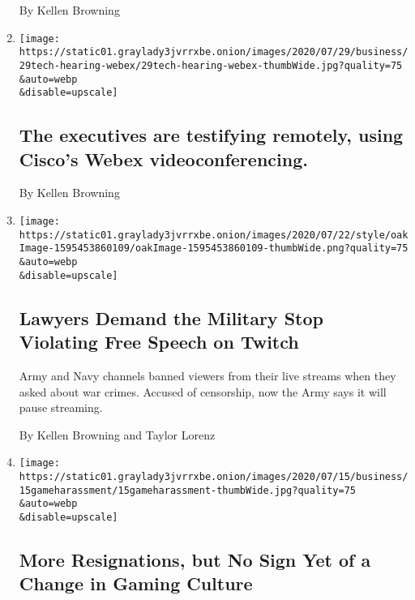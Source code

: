 \begin{enumerate}
  By Kellen Browning
\item
  \href{/live/2020/07/29/technology/tech-ceos-hearing-testimony/the-executives-are-testifying-remotely-using-ciscos-webex-videoconferencing}{}

  \texttt{[image: https://static01.graylady3jvrrxbe.onion/images/2020/07/29/business/29tech-hearing-webex/29tech-hearing-webex-thumbWide.jpg?quality=75\\\&auto=webp\\\&disable=upscale]}

  \hypertarget{the-executives-are-testifying-remotely-using-ciscos-webex-videoconferencing}{%
  \subsection{The executives are testifying remotely, using Cisco's
  Webex
  videoconferencing.}\label{the-executives-are-testifying-remotely-using-ciscos-webex-videoconferencing}}

  By Kellen Browning
\item
  \href{/2020/07/22/style/army-gamers-war-crimes-first-amendment.html}{}

  \texttt{[image: https://static01.graylady3jvrrxbe.onion/images/2020/07/22/style/oakImage-1595453860109/oakImage-1595453860109-thumbWide.png?quality=75\\\&auto=webp\\\&disable=upscale]}

  \hypertarget{lawyers-demand-the-military-stop-violating-free-speech-on-twitch}{%
  \subsection{Lawyers Demand the Military Stop Violating Free Speech on
  Twitch}\label{lawyers-demand-the-military-stop-violating-free-speech-on-twitch}}

  Army and Navy channels banned viewers from their live streams when
  they asked about war crimes. Accused of censorship, now the Army says
  it will pause streaming.

  By Kellen Browning and Taylor Lorenz
\item
  \href{/2020/07/19/technology/gaming-harassment.html}{}

  \texttt{[image: https://static01.graylady3jvrrxbe.onion/images/2020/07/15/business/15gameharassment/15gameharassment-thumbWide.jpg?quality=75\\\&auto=webp\\\&disable=upscale]}

  \hypertarget{more-resignations-but-no-sign-yet-of-a-change-in-gaming-culture}{%
  \subsection{More Resignations, but No Sign Yet of a Change in Gaming
  Culture}\label{more-resignations-but-no-sign-yet-of-a-change-in-gaming-culture}}


\end{enumerate}
